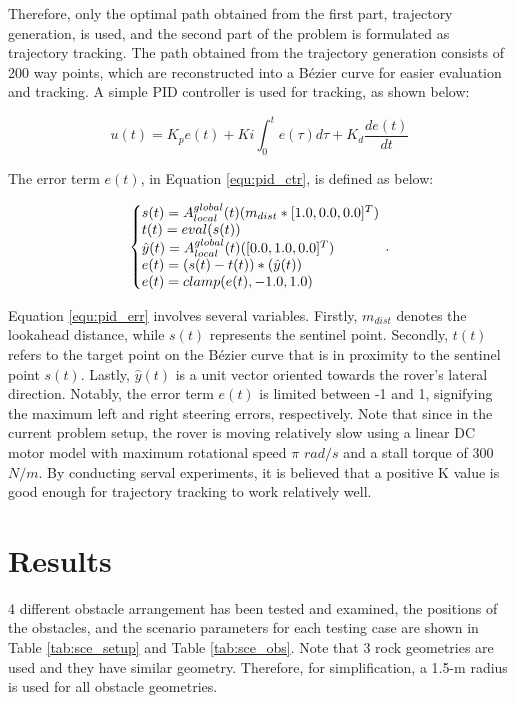 \documentclass{article}
\begin{document}
Therefore, only the optimal path obtained from the first part, trajectory generation, is used, and the second part of the problem is formulated as trajectory tracking. The path obtained from the trajectory generation consists of 200 way points, which are reconstructed into a Bézier curve for easier evaluation and tracking. A simple PID controller is used for tracking, as shown below:

\begin{equation}
	\label{equ:pid_ctr}
	u(t) = K_{p}e(t) + K{i}\int_{0}^{t}e(\tau)d\tau+K_{d}\frac{de(t)}{dt}
\end{equation}

The error term $e(t)$, in Equation \ref{equ:pid_ctr}, is defined as below: 

\begin{equation}
	\label{equ:pid_err}
	\left\{\begin{array}{@{}l@{}}
	s(t) = A_{local}^{global}(t)(m_{dist}*[1.0, 0.0, 0.0]^{T})  \\
	t(t) = eval(s(t)) \\
	\hat{y}(t) = A_{local}^{global}(t)([0.0, 1.0, 0.0]^{T})  \\
	e(t) = (s(t)-t(t))*(\hat{y}(t)) \\ 
	e(t) = clamp(e(t),-1.0, 1.0)  \\
	\end{array}\right.\,.
\end{equation}


Equation \ref{equ:pid_err} involves several variables. Firstly, $m_{dist}$ denotes the lookahead distance, while $s(t)$ represents the sentinel point. Secondly, $t(t)$ refers to the target point on the Bézier curve that is in proximity to the sentinel point $s(t)$. Lastly, $\hat{y}(t)$ is a unit vector oriented towards the rover's lateral direction. Notably, the error term $e(t)$ is limited between -1 and 1, signifying the maximum left and right steering errors, respectively. Note that since in the current problem setup, the rover is moving relatively slow using a linear DC motor model with maximum rotational speed $\pi$ $rad/s$ and a stall torque of 300 $N/m$. By conducting serval experiments, it is believed that a positive K value is good enough for trajectory tracking to work relatively well.

\section{Results}
4 different obstacle arrangement has been tested and examined, the positions of the obstacles, and the scenario parameters for each testing case are shown in Table \ref{tab:sce_setup} and Table \ref{tab:sce_obs}. Note that 3 rock geometries are used and they have similar geometry. Therefore, for simplification, a 1.5-m radius is used for all obstacle geometries.
\end{document}
